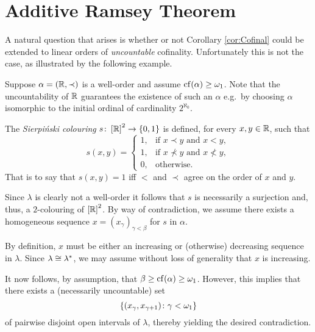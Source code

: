 \section{Additive Ramsey Theorem}

A natural question that arises is whether or not Corollary \ref{cor:Cofinal}
could be extended to linear orders of \textit{uncountable} cofinality.
Unfortunately this is not the case, as illustrated by the following example.

\begin{exm}
	Suppose $\alpha=(\mathbb{R},\prec)$ is a well-order and assume
	$\operatorname{cf}(\alpha)\geq\omega_1$.  Note that the uncountability of $\mathbb{R}$
	guarantees the existence of such an $\alpha$ e.g.\ by choosing $\alpha$
	isomorphic to the initial ordinal of cardinality $2^{\aleph_0}$.

	The \textit{Sierpi\'nski colouring} $s\colon\left[\mathbb{R}\right]^{2}\to\left\lbrace 0,1\right\rbrace$
	is defined, for every $x,y\in\mathbb{R}$, such that
	\begin{equation}
		s(x,y)=
		\begin{cases}
			1, & \text{if }x\prec y\text{ and }x<y,       \\
			1, & \text{if }x\nprec y\text{ and }x\not< y, \\
			0, & \text{otherwise.}
		\end{cases}
	\end{equation}
	That is to say that $s(x,y)=1$ iff $<$ and $\prec$ agree on the order of
	$x$ and $y$.

	Since $\lambda$ is clearly not a well-order it follows that $s$ is
	necessarily a surjection and, thus, a $2$-colouring of
	$\left[\mathbb{R}\right]^{2}$.  By way of contradiction, we assume there exists a
	homogeneous sequence $x=(x_{\gamma})_{\gamma<\beta}$ for $s$ in $\alpha$.

	By definition, $x$ must be either an increasing or (otherwise) decreasing
	sequence in $\lambda$.  Since $\lambda\cong{\lambda}^\ast$, we may assume
	without loss of generality that $x$ is increasing.

	It now follows, by assumption, that $\beta\geq\operatorname{cf}(\alpha)\geq\omega_1$.
	However, this implies that there exists a (necessarily uncountable) set
	\begin{equation}
		\left\lbrace (x_\gamma,x_{\gamma+1})\colon \gamma<\omega_1 \right\rbrace
	\end{equation}
	of pairwise disjoint open intervals of $\lambda$, thereby yielding the
	desired contradiction.
\end{exm}

